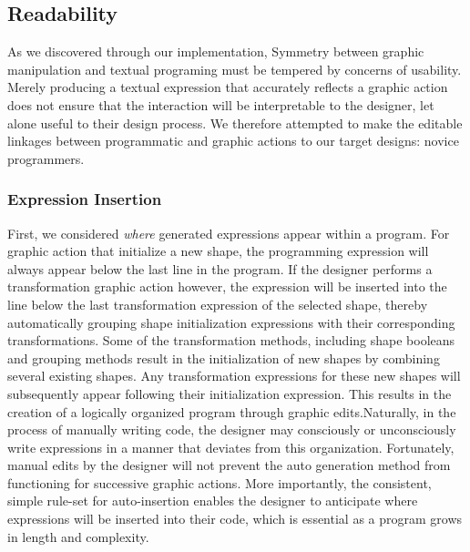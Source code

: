 \documentclass{sigchi}
\begin{document}
\subsection{Readability}
As we discovered through our implementation, Symmetry between graphic manipulation and textual programing must be tempered by concerns of usability. Merely producing a textual expression that accurately reflects a graphic action does not ensure that the interaction will be interpretable to the designer, let alone useful to their design process. We therefore attempted to make the editable linkages between programmatic and graphic actions to our target designs: novice programmers. 

\subsubsection{Expression Insertion}
First, we considered \textit{where} generated expressions appear within a program. For graphic action that initialize a new shape, the programming expression will always appear below the last line in the program. If the designer performs a transformation graphic action however, the expression will be inserted into the line below the last transformation expression of the selected shape, thereby automatically grouping shape initialization expressions with their corresponding transformations. Some of the transformation methods, including shape booleans and grouping methods result in the initialization of new shapes by combining several existing shapes. Any transformation expressions for these new shapes will subsequently appear following their initialization expression.  This results in the creation of a logically organized program through graphic edits.Naturally, in the process of manually writing code, the designer may consciously or unconsciously write expressions in a manner that deviates from this organization. Fortunately, manual edits by the designer will not prevent the auto generation method from functioning for successive graphic actions. More importantly, the consistent, simple rule-set for auto-insertion enables the designer to anticipate where expressions will be inserted into their code, which is essential as a program grows in length and complexity.
\end{document}
